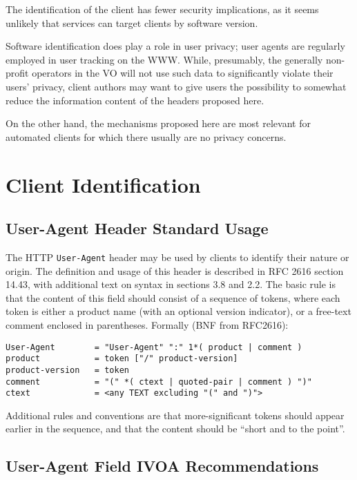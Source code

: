 \documentclass[11pt,a4paper]{ivoa}
\newcommand{\headername}[1]{{\tt #1}}
\begin{document}
The identification of the client has fewer security implications, as it
seems unlikely that services can target clients by software version.

Software identification does play a role in user privacy; user agents
are regularly employed in user tracking on the WWW.  While, presumably,
the generally non-profit operators in the VO will not use such data to
significantly violate their users' privacy, client authors may want to
give users the possibility to somewhat reduce the information content of
the headers proposed here.

On the other hand, the mechanisms proposed here are most relevant for
automated clients for which there usually are no privacy concerns.


\section{Client Identification}
\label{sect:client}

\subsection{User-Agent Header Standard Usage}

The HTTP \headername{User-Agent} header may be used by clients
to identify their
nature or origin. The definition and usage of this header is described
in RFC 2616 \citep{std:HTTP} section 14.43, with additional text on
syntax in sections 3.8 and 2.2. The basic rule is that the content of
this field should consist of a sequence of tokens, where each token is
either a product name (with an optional version indicator), or a
free-text comment enclosed in parentheses. Formally (BNF from RFC2616):

\begin{verbatim}
User-Agent        = "User-Agent" ":" 1*( product | comment )
product           = token ["/" product-version]
product-version   = token
comment           = "(" *( ctext | quoted-pair | comment ) ")"
ctext             = <any TEXT excluding "(" and ")">
\end{verbatim}

Additional rules and conventions are that more-significant tokens should
appear earlier in the sequence, and that the content should be ``short
and to the point''.

\subsection{User-Agent Field IVOA Recommendations}
\end{document}
